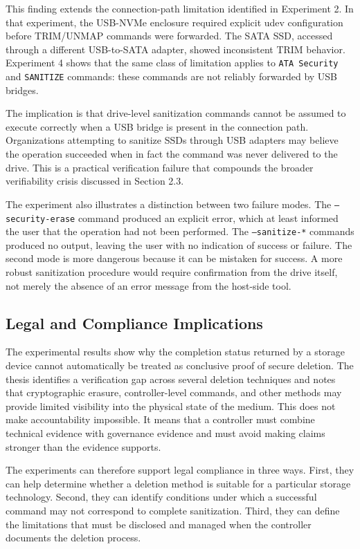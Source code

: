 This finding extends the connection-path limitation identified in Experiment 2. In that experiment, the USB-NVMe enclosure required explicit udev configuration before 
TRIM/UNMAP commands were forwarded. The SATA SSD, accessed through a different USB-to-SATA adapter, showed inconsistent TRIM behavior. Experiment 4 shows that the same 
class of limitation applies to \texttt{ATA Security} and \texttt{SANITIZE} commands: these commands are not reliably forwarded by USB bridges.

The implication is that drive-level sanitization commands cannot be assumed to execute correctly when a USB bridge is present in the connection path. Organizations 
attempting to sanitize SSDs through USB adapters may believe the operation succeeded when in fact the command was never delivered to the drive. This is a practical 
verification failure that compounds the broader verifiability crisis discussed in Section 2.3.

The experiment also illustrates a distinction between two failure modes. The \texttt{--security-erase} command produced an explicit error, which at least informed the 
user that the operation had not been performed. The \texttt{--sanitize-*} commands produced no output, leaving the user with no indication of success or failure. The 
second mode is more dangerous because it can be mistaken for success. A more robust sanitization procedure would require confirmation from the drive itself, not merely 
the absence of an error message from the host-side tool.


\subsection*{Legal and Compliance Implications}
The experimental results show why the completion status returned by a storage device cannot automatically be treated as conclusive proof of secure deletion. The thesis 
identifies a verification gap across several deletion techniques and notes that cryptographic erasure, controller-level commands, and other methods may provide limited 
visibility into the physical state of the medium. This does not make accountability impossible. It means that a controller must combine technical evidence with 
governance evidence and must avoid making claims stronger than the evidence supports.

The experiments can therefore support legal compliance in three ways. First, they can help determine whether a deletion method is suitable for a particular storage 
technology. Second, they can identify conditions under which a successful command may not correspond to complete sanitization. Third, they can define the limitations 
that must be disclosed and managed when the controller documents the deletion process.

